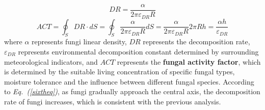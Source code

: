 \begin{equation}
  \label{sixtheq}
  DR = \frac{\alpha}{2\pi \varepsilon_{DR} R}
\end{equation}
\begin{equation}
  \label{seventheq}
  ACT=\oint_S DR\cdot dS = \oint_S \frac{\alpha}{2\pi \varepsilon_{DR} R} dS = \frac{\alpha}{2\pi \varepsilon_{DR} R} 2\pi R h = \frac{\alpha h}{\varepsilon_{DR}}
\end{equation}
where $\alpha$ represents fungi linear density, $DR$ represents the decomposition rate, $\varepsilon_{DR}$ represents environmental decomposition constant determined by surrounding meteorological indicators, and $ACT$ represents the \textbf{fungal activity factor}, which is determined by the suitable living concentration of specific fungal types, moisture tolerance and the influence between different fungal species. According to \textit{Eq.~(\ref{sixtheq})}, as fungi gradually approach the central axis, the decomposition rate of fungi increases, which is consistent with the previous analysis.